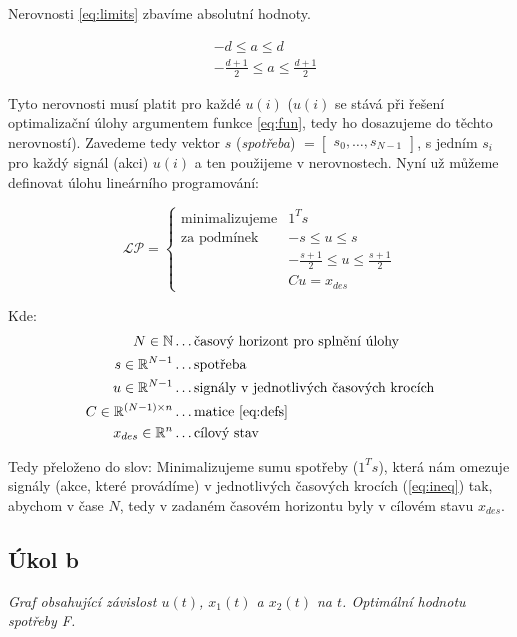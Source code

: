 \documentclass[10pt,a4paper,openright]{article}
\begin{document}
Nerovnosti \ref{eq:limits} zbavíme absolutní hodnoty.


\begin{equation}\label{eq:ineq}
	\begin{split}
	&-d \leq a \leq d\\
	&-\frac{d+1}{2} \leq a \leq \frac{d+1}{2}
	\end{split}
\end{equation}

Tyto nerovnosti musí platit pro každé $u(i)$ ($u(i)$ se stává při řešení optimalizační úlohy 
argumentem funkce \ref{eq:fun}, tedy ho dosazujeme do těchto nerovností). Zavedeme tedy vektor
$s$ (\textit{spotřeba}) $= \begin{bmatrix}s_0,\hdots,s_{N-1} \end{bmatrix}$,
s jedním $s_i$ pro každý signál (akci) $u(i)$ a ten použijeme v nerovnostech. Nyní už můžeme
definovat úlohu lineárního programování:

\begin{equation}
	\mathcal{LP} = 
	\begin{cases}
		\text{minimalizujeme} & 1^Ts\\
		\text{za podmínek} & -s \leq u \leq s\\
		& -\frac{s+1}{2} \leq u \leq \frac{s+1}{2}\\
		& Cu = x_{des}
	\end{cases}
\end{equation}

Kde:
\begin{equation}
	\begin{split}
		N \in \mathbb{N} & \hdots \text{časový horizont pro splnění úlohy}\\
		s \in \mathbb{R}^{N-1} & \hdots \text{spotřeba}\\
		u \in \mathbb{R}^{N-1} & \hdots \text{signály v jednotlivých časových krocích}\\
		C \in \mathbb{R}^{(N-1) \times n} & \hdots \text{matice \ref{eq:defs}} \\
		x_{des} \in \mathbb{R}^{n} & \hdots \text{cílový stav}
	\end{split}
\end{equation}

Tedy přeloženo do slov: Minimalizujeme sumu spotřeby ($1^Ts$), 
která nám omezuje signály (akce, které provádíme) v jednotlivých časových krocích (\ref{eq:ineq}) 
tak, abychom v čase $N$, tedy v zadaném časovém horizontu byly v cílovém stavu $x_{des}$.


\subsection{Úkol b}

\textit{Graf obsahující závislost $u(t)$, $x_1(t)$ a $x_2(t)$ na $t$. Optimální hodnotu spotřeby F.}
\vspace{.4cm}
\end{document}
